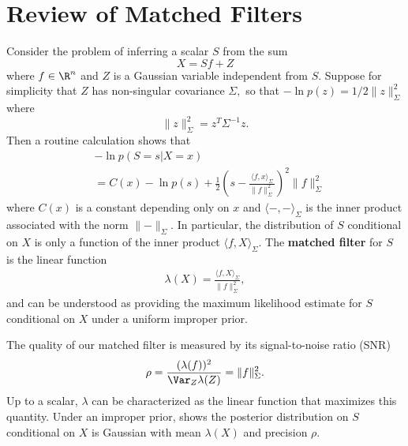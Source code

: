 \section{Review of Matched Filters \label{appendix:matched}}

Consider the problem of inferring a scalar $S$ from the sum
$$
X = S f + Z
$$
where $f \in \R^n$ and $Z$ is a Gaussian variable independent from $S.$ Suppose for simplicity that $Z$ has non-singular covariance $\Sigma,$ so that $- \ln p(z) = 1/2 \lVert z \rVert_\Sigma^2$ where
$$
	\lVert z \rVert_\Sigma^2 = z^T \Sigma^{-1} z.
$$
Then a routine calculation shows that
\begin{align}
	 & - \ln p(S = s|X = x) \nonumber                                                                                                           \\
	 & = C(x) - \ln p(s)  + \frac 1 2 \left (s - \frac{\langle f, x \rangle_\Sigma}{\lVert f \rVert_\Sigma^2}\right)^2 \lVert f \rVert^2_\Sigma
	\label{eq:gaussian-posterior}
\end{align}
where $C(x)$ is a constant depending only on $x$ and $\langle -, - \rangle_\Sigma$ is the inner product associated with the norm $\lVert - \rVert_\Sigma.$ In particular, the distribution of $S$ conditional on $X$ is only a function of the inner product $\langle f, X \rangle_\Sigma.$ The \textbf{matched filter} for $S$ is the linear function
\begin{align*}
	\lambda(X) = \frac{\langle f, X \rangle_\Sigma}{\lVert f \rVert_\Sigma^2},
\end{align*}
and can be understood as providing the maximum likelihood estimate for $S$ conditional on $X$ under a uniform improper prior.

The quality of our matched filter is measured by its signal-to-noise ratio (SNR)
\begin{align*}
	\rho = \frac{(\lambda(f))^2}{\Var_Z \lambda(Z)} = \lVert f \rVert_\Sigma^2.
\end{align*}
Up to a scalar, $\lambda$ can be characterized as the linear function that maximizes this quantity. Under an improper prior,  shows the posterior distribution on $S$ conditional on $X$ is Gaussian with mean $\lambda(X)$ and precision $\rho.$
